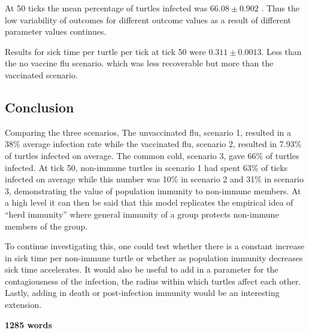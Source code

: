 \documentclass[11pt]{article} %
\begin{document}

At 50 ticks the mean percentage of turtles infected was $66.08 \pm 0.902$ . Thus the low variability of outcomes for different outcome values as a result of different parameter values continues. 

Results for sick time per turtle per tick at tick 50 were $0.311 \pm 0.0013$. Less than the no vaccine flu scenario. which was less recoverable but more than the vaccinated scenario. 


\subsection{Conclusion}

Comparing the three scenarios, The unvaccinated flu, scenario 1, resulted in a 38\% average infection rate while the vaccinated flu, scenario 2, resulted in 7.93\% of turtles infected on average. The common cold, scenario 3,  gave 66\% of turtles infected. At tick 50, non-immune turtles in scenario 1 had spent 63\% of ticks infected on average while this number was  10\% in scenario 2 and 31\% in scenario 3, demonstrating the value of population immunity to non-immune members.  At a high level it can then be said that this model replicates the empirical idea of ``herd immunity'' where general immunity of a group protects non-immune members of the group. 

To continue investigating this, one could test whether there is a constant increase in sick time per non-immune turtle or whether as population immunity decreases sick time accelerates. It would also be useful to add in a parameter for the contagiousness of the infection, the radius within which turtles affect each other. Lastly, adding in death or post-infection immunity would be an interesting extension. 


\textbf{1285 words}


\nocite{*}


\printbibliography
\end{document}
